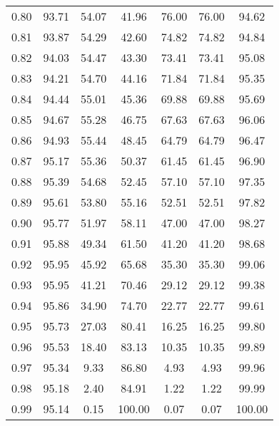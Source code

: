 \begin{tabular}{|c|c|c|c|c|c|c|}
      0.80 &     93.71 &     54.07 &      41.96 &   76.00 &      76.00 &         94.62 \\
      0.81 &     93.87 &     54.29 &      42.60 &   74.82 &      74.82 &         94.84 \\
      0.82 &     94.03 &     54.47 &      43.30 &   73.41 &      73.41 &         95.08 \\
      0.83 &     94.21 &     54.70 &      44.16 &   71.84 &      71.84 &         95.35 \\
      0.84 &     94.44 &     55.01 &      45.36 &   69.88 &      69.88 &         95.69 \\
      0.85 &     94.67 &     55.28 &      46.75 &   67.63 &      67.63 &         96.06 \\
      0.86 &     94.93 &     55.44 &      48.45 &   64.79 &      64.79 &         96.47 \\
      0.87 &     95.17 &     55.36 &      50.37 &   61.45 &      61.45 &         96.90 \\
      0.88 &     95.39 &     54.68 &      52.45 &   57.10 &      57.10 &         97.35 \\
      0.89 &     95.61 &     53.80 &      55.16 &   52.51 &      52.51 &         97.82 \\
      0.90 &     95.77 &     51.97 &      58.11 &   47.00 &      47.00 &         98.27 \\
      0.91 &     95.88 &     49.34 &      61.50 &   41.20 &      41.20 &         98.68 \\
      0.92 &     95.95 &     45.92 &      65.68 &   35.30 &      35.30 &         99.06 \\
      0.93 &     95.95 &     41.21 &      70.46 &   29.12 &      29.12 &         99.38 \\
      0.94 &     95.86 &     34.90 &      74.70 &   22.77 &      22.77 &         99.61 \\
      0.95 &     95.73 &     27.03 &      80.41 &   16.25 &      16.25 &         99.80 \\
      0.96 &     95.53 &     18.40 &      83.13 &   10.35 &      10.35 &         99.89 \\
      0.97 &     95.34 &      9.33 &      86.80 &    4.93 &       4.93 &         99.96 \\
      0.98 &     95.18 &      2.40 &      84.91 &    1.22 &       1.22 &         99.99 \\
      0.99 &     95.14 &      0.15 &     100.00 &    0.07 &       0.07 &        100.00 \\
\bottomrule
\end{tabular}
